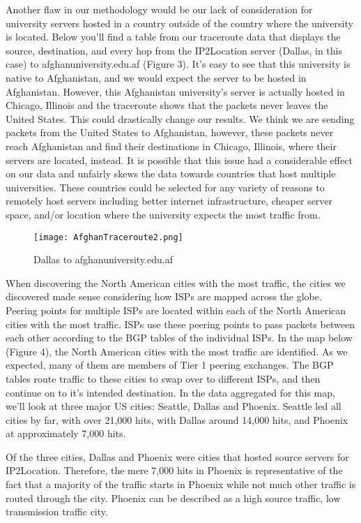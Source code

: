 \documentclass{sigcomm-alternate}
\begin{document}
	Another flaw in our methodology would be our lack of consideration for university servers hosted in a country outside of the country where the university is located. Below you’ll find a table from our traceroute data that displays the source, destination, and every hop from the IP2Location server (Dallas, in this case) to afghanuniversity.edu.af (Figure 3). It’s easy to see that this university is native to Afghanistan, and we would expect the server to be hosted in Afghanistan. However, this Afghanistan university’s server is actually hosted in Chicago, Illinois and the traceroute shows that the packets never leaves the United States. This could drastically change our results. We think we are sending packets from the United States to Afghanistan, however, these packets never reach Afghanistan and find their destinations in Chicago, Illinois, where their servers are located, instead. It is possible that this issue had a considerable effect on our data and unfairly skews the data towards countries that host multiple universities. These countries could be selected for any variety of reasons to remotely host servers including better internet infrastructure, cheaper server space, and/or location where the university expects the most traffic from.
	
\begin{figure}[h!]
  \caption{Dallas to afghanuniversity.edu.af}
  \centering
    \texttt{[image: AfghanTraceroute2.png]}
\end{figure}	

When discovering the North American cities with the most traffic, the cities we discovered made sense considering how ISPs are mapped across the globe. Peering points for multiple ISPs are located within each of the North American cities with the most traffic. ISPs use these peering points to pass packets between each other according to the BGP tables of the individual ISPs. In the map below (Figure 4), the North American cities with the most traffic are identified. As we expected, many of them are members of Tier 1 peering exchanges. The BGP tables route traffic to these cities to swap over to different ISPs, and then continue on to it’s intended destination. In the data aggregated for this map, we’ll look at three major US cities: Seattle, Dallas and Phoenix. Seattle led all cities by far, with over 21,000 hits, with Dallas around 14,000 hits, and Phoenix at approximately 7,000 hits. 

Of the three cities, Dallas and Phoenix were cities that hosted source servers for IP2Location. Therefore, the mere 7,000 hits in Phoenix is representative of the fact that a majority of the traffic starts in Phoenix while not much other traffic is routed through the city. Phoenix can be described as a high source traffic, low transmission traffic city. 
\end{document}
